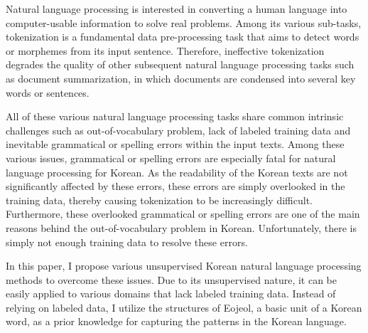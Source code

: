 \documentclass[oneside, ko,phd]{snuthesis_utf8_kor}
\begin{document}
\begin{bibpage}

\nocite{*}
\end{bibpage}

\begin{abstractalt}
Natural language processing is interested in converting a human language into computer-usable information to solve real problems.
Among its various sub-tasks, tokenization is a fundamental data pre-processing task that aims to detect words or morphemes from its input sentence.
Therefore, ineffective tokenization degrades the quality of other subsequent natural language processing tasks such as document summarization, in which documents are condensed into several key words or sentences.

All of these various natural language processing tasks share common intrinsic challenges such as out-of-vocabulary problem, lack of labeled training data and inevitable grammatical or spelling errors within the input texts.
Among these various issues, grammatical or spelling errors are especially fatal for natural language processing for Korean.
As the readability of the Korean texts are not significantly affected by these errors, these errors are simply overlooked in the training data, thereby causing tokenization to be increasingly difficult.
Furthermore, these overlooked grammatical or spelling errors are one of the main reasons behind the out-of-vocabulary problem in Korean.
Unfortunately, there is simply not enough training data to resolve these errors.

In this paper, I propose various unsupervised Korean natural language processing methods to overcome these issues.
Due to its unsupervised nature, it can be easily applied to various domains that lack labeled training data.
Instead of relying on labeled data, I utilize the structures of Eojeol, a basic unit of a Korean word, as a prior knowledge for capturing the patterns in the Korean language.


\end{abstractalt}
\end{document}

